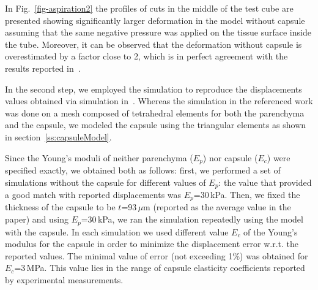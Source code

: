 \documentclass{acm_proc_article-sp}
\newcommand{\TG}[1]{{\color{blue}\textbf{TG: #1}}}
\begin{document}
In Fig.~\ref{fig-aspiration2} the profiles of cuts in the middle of the
test cube are presented showing significantly larger deformation in the model without capsule assuming that the same negative pressure was applied 
on the tissue surface inside the tube. Moreover, it can be observed that the deformation without capsule is overestimated by a factor 
close to 2, which is in perfect agreement with the results reported in~\cite{Hollenstein2006}.

In the second step, we employed the simulation to reproduce the displacements values obtained via simulation in~\cite{Hollenstein2006,Nava2008}.
Whereas the simulation in the referenced work was done on a mesh composed of tetrahedral elements for both the parenchyma 
and the capsule, we modeled the capsule using the triangular elements as shown in section~\ref{ss:capsuleModel}.

Since the Young's moduli of neither parenchyma ($E_p$) nor capsule ($E_c$) were specified exactly, we obtained both as follows: first, 
we performed a set of simulations without the capsule for different values of $E_p$: the value that provided a good match 
with reported displacements was $E_p$=30\,kPa. 
Then, we fixed the thickness of the capsule to be $t$=93\,$\mu$m (reported as the average value in the paper) and 
using $E_p$=30\,kPa, we ran the simulation repeatedly using the model with the capsule. In each simulation we 
used different value $E_c$ of the Young's modulus for the capsule in order to minimize the displacement error w.r.t. the 
reported values. The minimal value of error (not exceeding 1\%) was obtained for $E_c$=3\,MPa. This 
value lies in the range of capsule elasticity coefficients reported by experimental measurements.


\end{document}
